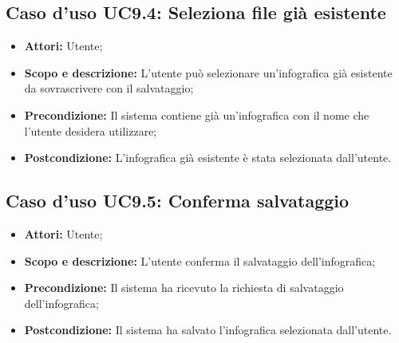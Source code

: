 \subsection{Caso d'uso UC9.4: Seleziona file già esistente}
\begin{itemize}
	\item \textbf{Attori:} Utente;
	\item \textbf{Scopo e descrizione:} L'utente può selezionare un'\gls{infografica} già esistente da sovrascrivere con il salvataggio;
	\item \textbf{Precondizione:} Il sistema contiene già un'\gls{infografica} con il nome che l'utente desidera utilizzare;
	\item \textbf{Postcondizione:} L'\gls{infografica} già esistente è stata selezionata dall'utente.
\end{itemize}

\subsection{Caso d'uso UC9.5: Conferma salvataggio}
\begin{itemize}
	\item \textbf{Attori:} Utente;
	\item \textbf{Scopo e descrizione:} L'utente conferma il salvataggio dell'\gls{infografica};
	\item \textbf{Precondizione:} Il sistema ha ricevuto la richiesta di salvataggio dell'\gls{infografica};
	\item \textbf{Postcondizione:} Il sistema ha salvato l'\gls{infografica} selezionata dall'utente.
\end{itemize}